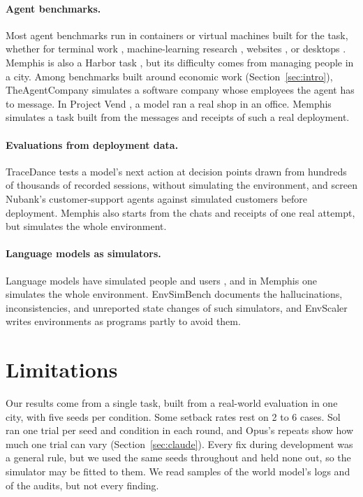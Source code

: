 \documentclass[10pt]{article}
\begin{document}
\paragraph{Agent benchmarks.} Most agent benchmarks run in containers or virtual machines built for the task, whether for terminal work
\citep{merrill2026terminalbench}, machine-learning research \citep{chan2024mlebench, wijk2024rebench,
starace2025paperbench}, websites \citep{zhou2023webarena}, or desktops \citep{xie2024osworld}. Memphis is also
a Harbor task \citep{harbor2026}, but its difficulty comes from managing people in a city.
Among benchmarks built around economic work (Section~\ref{sec:intro}), TheAgentCompany \citep{xu2024theagentcompany} simulates a software company whose employees the agent has to
message. In Project Vend
\citep{anthropic2025vend}, a model ran a real shop in an office. Memphis simulates a task built from the messages and receipts of such a real deployment.

\paragraph{Evaluations from deployment data.} TraceDance \citep{min2026tracedance} tests a model's next action at decision points drawn from hundreds of thousands of recorded sessions, without simulating the environment, and \citet{alcoba2026screen} screen Nubank's customer-support agents against simulated customers before deployment. Memphis also starts from the chats and receipts of one real attempt, but simulates the whole environment.

\paragraph{Language models as simulators.} Language models have simulated people \citep{park2023generative} and users \citep{yao2024taubench, barres2025tau2}, and in Memphis one simulates the whole environment. EnvSimBench \citep{liu2026envsimbench} documents the hallucinations, inconsistencies, and unreported state changes of such simulators, and EnvScaler \citep{song2026envscaler} writes environments as programs partly to avoid
them.

\section{Limitations}
\label{sec:limits}

Our results come from a single task, built from a real-world evaluation in one city, with five seeds per condition. Some setback rates rest on 2 to 6 cases. Sol ran one trial per seed and condition in each round, and Opus's repeats show how much one trial can vary (Section~\ref{sec:claude}). Every fix during development was a general rule, but we used the same seeds throughout and held none out, so the simulator may be fitted to them. We read samples of the world model's logs and of the audits, but not every finding.
\end{document}
